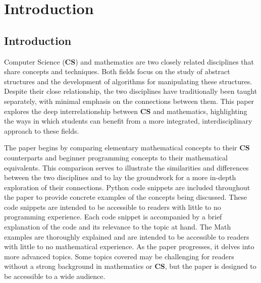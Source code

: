 \chapter{Introduction}

\section{Introduction}

Computer Science (\textbf{CS}) and mathematics are two closely related disciplines that share concepts and techniques. Both fields focus on the study of abstract structures and the development of algorithms for manipulating these structures. Despite their close relationship, the two disciplines have traditionally been taught separately, with minimal emphasis on the connections between them. This paper explores the deep interrelationship between \textbf{CS} and mathematics, highlighting the ways in which students can benefit from a more integrated, interdisciplinary approach to these fields.

The paper begins by comparing elementary mathematical concepts to their \textbf{CS} counterparts and beginner programming concepts to their mathematical equivalents. This comparison serves to illustrate the similarities and differences between the two disciplines and to lay the groundwork for a more in-depth exploration of their connections. Python code snippets are included throughout the paper to provide concrete examples of the concepts being discussed. These code snippets are intended to be accessible to readers with little to no programming experience. Each code snippet is accompanied by a brief explanation of the code and its relevance to the topic at hand. The Math examples are thoroughly explained and are intended to be accessible to readers with little to no mathematical experience. As the paper progresses, it delves into more advanced topics. Some topics covered may be challenging for readers without a strong background in mathematics or \textbf{CS}, but the paper is designed to be accessible to a wide audience.
